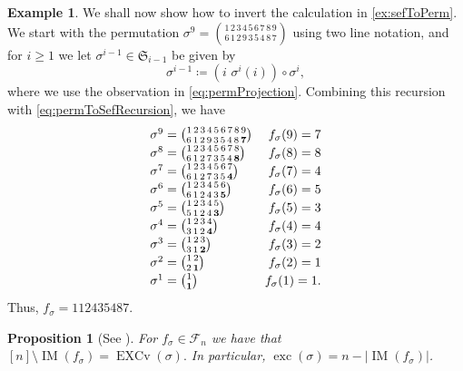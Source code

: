 \documentclass[reqno]{amsart}
\newtheorem{proposition}[theorem]{Proposition}
\theoremstyle{definition}
\newtheorem{example}[theorem]{Example}
\newcommand{\symS}{\mathfrak{S}}
\newcommand{\SEF}{\mathcal{F}}  %
\DeclareMathOperator{\exc}{exc}
\DeclareMathOperator{\EXCv}{EXCv}
\DeclareMathOperator{\supp}{IM}
\begin{document}
\begin{example}\label{ex:permToSef}
We shall now show how to invert the calculation in \cref{ex:sefToPerm}.
We start with the permutation $\sigma^9=\binom{1\,2\,3\,4\,5\,6\,7\,8\,9}{6\,1\,2\,9\,3\,5\,4\,8\,7}$ using two line notation,
and for $i \geq 1$ we let $\sigma^{i-1} \in \symS_{i-1}$ be given by
\[
  \sigma^{i-1} \coloneqq (i\,\,\sigma^i(i))\circ\sigma^{i}  ,
\]
where we use the observation in \eqref{eq:permProjection}.
Combining this recursion with \eqref{eq:permToSefRecursion},
we have
\begin{equation*}
\begingroup
\renewcommand*{\arraystretch}{1.2}
\begin{array}{lr}
	\sigma^9=\binom{1\,2\,3\,4\,5\,6\,7\,8\,9}{6\,1\,2\,9\,3\,5\,4\,8\,\mathbf 7}  & f_{\sigma}(9)=7 \\
	\sigma^8=\binom{1\,2\,3\,4\,5\,6\,7\,8}{6\,1\,2\,7\,3\,5\,4\,\mathbf 8 } & f_{\sigma}(8)=8 \\
	\sigma^7=\binom{1\,2\,3\,4\,5\,6\,7}{6\,1\,2\,7\,3\,5\, \mathbf 4} & f_{\sigma}(7)=4 \\
	\sigma^6=\binom{1\,2\,3\,4\,5\,6}{6\,1\,2\,4\,3\,\mathbf  5} & f_{\sigma}(6)=5 \\
	\sigma^5=\binom{1\,2\,3\,4\,5}{5\,1\,2\,4\,\mathbf  3} & f_{\sigma}(5)=3 \\
	\sigma^4=\binom{1\,2\,3\,4}{3\,1\,2\,\mathbf  4} & f_{\sigma}(4)=4 \\
	\sigma^3=\binom{1\,2\,3}{3\,1\,\mathbf  2} & f_{\sigma}(3)=2 \\
	\sigma^2=\binom{1\,2}{2\,\mathbf  1} & f_{\sigma}(2)=1 \\
	\sigma^1=\binom{1}{\mathbf 1} & f_{\sigma}(1)=1.
\end{array}
\endgroup
\end{equation*}
Thus, $f_{\sigma}=112435487$.
\end{example}



\begin{proposition}[{See \cite[Prop. 3.5]{MantaciRakotondrajao2001}}]\label{prop:excAsIm}
For $f_{\sigma} \in \SEF_n$ we have that
$
 [n] \setminus \supp(f_{\sigma}) = \EXCv(\sigma).
$
In particular, $\exc(\sigma) = n - |\supp(f_{\sigma})|$.
\end{proposition}
\end{document}
